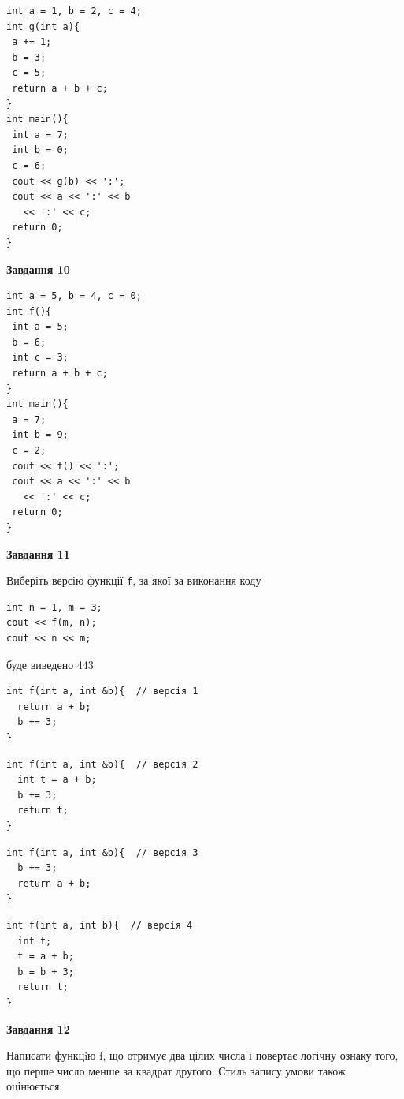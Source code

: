 \documentclass[12pt, ukrainian]{article}
\def\code#1{\Verb!#1!}
\begin{document}
{\begin {large}
\begin{minipage}[t]{7.0cm}
\begin{verbatim}
int a = 1, b = 2, c = 4;
int g(int a){
 a += 1;
 b = 3;
 c = 5;
 return a + b + c;
}
int main(){
 int a = 7;
 int b = 0;
 c = 6;
 cout << g(b) << ':';
 cout << a << ':' << b 
   << ':' << c;
 return 0;
}
\end{verbatim}



\begin{center}
\textbf{Завдання 10}
\end{center}
\vspace{-8mm}

\begin{verbatim}
int a = 5, b = 4, c = 0;
int f(){
 int a = 5;
 b = 6;
 int c = 3;
 return a + b + c;
}
int main(){
 a = 7;
 int b = 9;
 c = 2;
 cout << f() << ':';
 cout << a << ':' << b 
   << ':' << c;
 return 0;
}
\end{verbatim}

\end{minipage}
\vline \hspace{1mm}
\begin{minipage}[t]{11.0cm}

\begin{center}
\textbf{Завдання 11}
\end{center}
Виберіть версію функції \code{f}, за якої за виконання коду
\begin{verbatim}
int n = 1, m = 3;
cout << f(m, n);
cout << n << m;
\end{verbatim}

буде виведено 443

\begin{verbatim}
int f(int a, int &b){  // версія 1
  return a + b;
  b += 3;
}
\end{verbatim}

\vspace{-8mm}\begin{verbatim}
int f(int a, int &b){  // версія 2
  int t = a + b;
  b += 3;
  return t;
}
\end{verbatim}

\vspace{-8mm}\begin{verbatim}
int f(int a, int &b){  // версія 3
  b += 3;
  return a + b;
}
\end{verbatim}

\vspace{-8mm}\begin{verbatim}
int f(int a, int b){  // версія 4
  int t;
  t = a + b;
  b = b + 3;
  return t;
}
\end{verbatim}



\begin{center}
\textbf{Завдання 12}
\end{center}

Написати функцiю f, що отримує два цілих числа і повертає логічну ознаку того, що перше число менше за квадрат другого. Стиль запису умови також оцінюється.\par

\end{minipage}

\end {large}}
\end{document}
